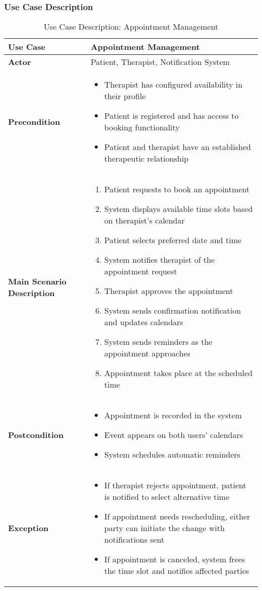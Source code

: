 \subsubsection{Use Case Description}
\begin{table}[h]
\centering
\begin{tabular}{|p{3cm}|p{10cm}|}
\hline
\textbf{Use Case} & Appointment Management \\
\hline
\textbf{Actor} & Patient, Therapist, Notification System \\
\hline
\textbf{Precondition} & 
\begin{itemize}
    \item Therapist has configured availability in their profile
    \item Patient is registered and has access to booking functionality
    \item Patient and therapist have an established therapeutic relationship
\end{itemize} \\
\hline
\textbf{Main Scenario Description} & 
\begin{enumerate}
    \item Patient requests to book an appointment
    \item System displays available time slots based on therapist's calendar
    \item Patient selects preferred date and time
    \item System notifies therapist of the appointment request
    \item Therapist approves the appointment
    \item System sends confirmation notification and updates calendars
    \item System sends reminders as the appointment approaches
    \item Appointment takes place at the scheduled time
\end{enumerate} \\
\hline
\textbf{Postcondition} & 
\begin{itemize}
    \item Appointment is recorded in the system
    \item Event appears on both users' calendars
    \item System schedules automatic reminders
\end{itemize} \\
\hline
\textbf{Exception} & 
\begin{itemize}
    \item If therapist rejects appointment, patient is notified to select alternative time
    \item If appointment needs rescheduling, either party can initiate the change with notifications sent
    \item If appointment is canceled, system frees the time slot and notifies affected parties
\end{itemize} \\
\hline
\end{tabular}
\caption{Use Case Description: Appointment Management}
\end{table}

